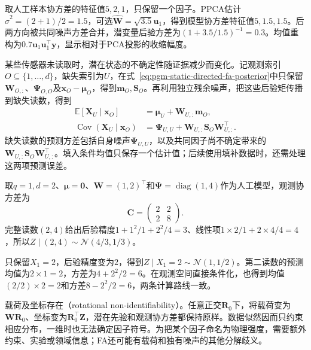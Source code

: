 取人工样本协方差的特征值$5,2,1$，只保留一个因子。PPCA估计$\widehat\sigma^2=(2+1)/2=1.5$，可选$\widehat{\bm W}=\sqrt{3.5}\bm u_1$，得到模型协方差特征值$5,1.5,1.5$。后两方向被共同噪声方差合并，潜变量后验方差为$(1+3.5/1.5)^{-1}=0.3$。均值重构为$0.7\bm u_1\bm u_1^\top\bm y$，显示相对于PCA投影的收缩幅度。

某些传感器未读取时，潜在状态的不确定性随证据减少而变化。记观测索引$O\subseteq\{1,\ldots,d\}$，缺失索引为$U$，在式~\eqref{eq:pgm-static-directed-fa-posterior}中只保留$\bm W_{O,:}$、$\bm\Psi_{O,O}$及$\bm x_O-\bm\mu_O$，得到$\bm m_O,\bm S_O$。再利用独立残余噪声，把这些后验矩传播到缺失读数，得到
\begin{equation}
  \label{eq:pgm-static-directed-fa-missing}
  \begin{aligned}
    \mathbb{E}[\bm{X}_U\mid\bm{x}_O]
      &=\bm{\mu}_U+\bm{W}_{U,:}\bm{m}_O,\\
    \operatorname{Cov}(\bm{X}_U\mid\bm{x}_O)
      &=\bm{\Psi}_{U,U}
        +\bm{W}_{U,:}\bm{S}_O\bm{W}_{U,:}^\top.
  \end{aligned}
\end{equation}
缺失读数的预测方差包括自身噪声$\bm\Psi_{U,U}$，以及共同因子尚不确定带来的$\bm W_{U,:}\bm S_O\bm W_{U,:}^\top$。填入条件均值只保存一个估计值；后续使用填补数据时，还需处理这两项预测误差。

\begin{example}[两台传感器对一个连续因子的测量]
  \label{ex:pgm-static-directed-fa-missing}
  取$q=1,d=2$、$\bm\mu=\bm{0}$、$\bm W=(1,2)^\top$和$\bm\Psi=\operatorname{diag}(1,4)$作为人工模型，观测协方差为
  \[
    \bm{C}=\begin{pmatrix}2&2\\2&8\end{pmatrix}.
  \]
  完整读数$(2,4)$给出后验精度$1+1^2/1+2^2/4=3$、线性项$1\times2/1+2\times4/4=4$，所以$Z\mid(2,4)\sim\mathcal N(4/3,1/3)$。

  只保留$X_1=2$，后验精度变为$2$，得到$Z\mid X_1=2\sim\mathcal N(1,1/2)$。第二读数的预测均值为$2\times1=2$，方差为$4+2^2/2=6$。在观测空间直接条件化，也得到均值$(2/2)\times2=2$和方差$8-2^2/2=6$，两条计算路线一致。
\end{example}

载荷及坐标存在（rotational non-identifiability）。任意正交$\bm R_0$下，将载荷变为$\bm W\bm R_0$、坐标变为$\bm R_0^\top\bm Z$，潜在先验和观测协方差都保持原样。数据似然因而只约束相应分布，一维时也无法确定因子符号。为把某个因子命名为物理强度，需要额外约束、实验或领域信息；FA还可能有载荷和独有噪声的其他分解歧义。

